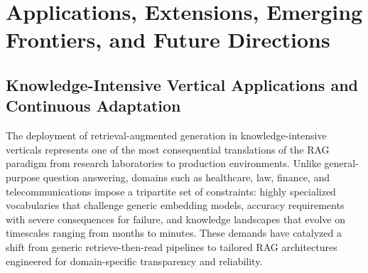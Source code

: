 \documentclass[11pt,a4paper]{article}
\begin{document}
\section{Applications, Extensions, Emerging Frontiers, and Future Directions}



\subsection{Knowledge-Intensive Vertical Applications and Continuous Adaptation}


The deployment of retrieval-augmented generation in knowledge-intensive verticals represents one of the most consequential translations of the RAG paradigm from research laboratories to production environments. Unlike general-purpose question answering, domains such as healthcare, law, finance, and telecommunications impose a tripartite set of constraints: highly specialized vocabularies that challenge generic embedding models, accuracy requirements with severe consequences for failure, and knowledge landscapes that evolve on timescales ranging from months to minutes. These demands have catalyzed a shift from generic retrieve-then-read pipelines to tailored RAG architectures engineered for domain-specific transparency and reliability.
\end{document}
